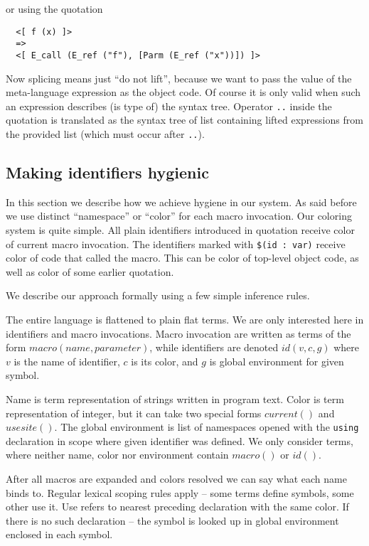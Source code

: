 \documentclass{llncs}
\begin{document}
\noindent
or using the quotation

\begin{verbatim}
  <[ f (x) ]> 
  =>
  <[ E_call (E_ref ("f"), [Parm (E_ref ("x"))]) ]>
\end{verbatim}

Now splicing means just ``do not lift'', because we want to pass the value of 
the meta-language expression as the object code. Of course it is only valid 
when such an expression describes (is type of) the syntax tree. Operator \verb,.., 
inside the quotation is translated as the syntax tree of list containing lifted 
expressions from the provided list (which must occur after \verb,..,).

\subsection{Making identifiers hygienic}
In this section we describe how we achieve hygiene in our system.
As said before we use distinct ``namespace'' or ``color'' for each macro
invocation. Our coloring system is quite simple.  All plain identifiers
introduced in quotation receive color of current macro invocation. The
identifiers marked with \verb,$(id : var), receive color of code that
called the macro. This can be color of top-level object code, as well
as color of some earlier quotation.

We describe our approach formally using a few simple inference rules.

The entire language is flattened to plain flat terms. We are only
interested here in identifiers and macro invocations.  Macro invocation
are written as terms of the form $macro(name, parameter)$, while
identifiers are denoted $id(v,c,g)$ where $v$ is the name of identifier,
$c$ is its color, and $g$ is global environment for given symbol.

Name is term representation of strings written in program text. Color
is term representation of integer, but it can take two special forms
$current()$ and $usesite()$. The global environment is list of namespaces
opened with the \verb,using, declaration in scope where given identifier
was defined. We only consider terms, where neither name, color nor environment
contain $macro()$ or $id()$.

After all macros are expanded and colors resolved we can say what each
name binds to. Regular lexical scoping rules apply -- some terms define
symbols, some other use it. Use refers to nearest preceding declaration
with the same color. If there is no such declaration -- the symbol is
looked up in global environment enclosed in each symbol.
\end{document}
